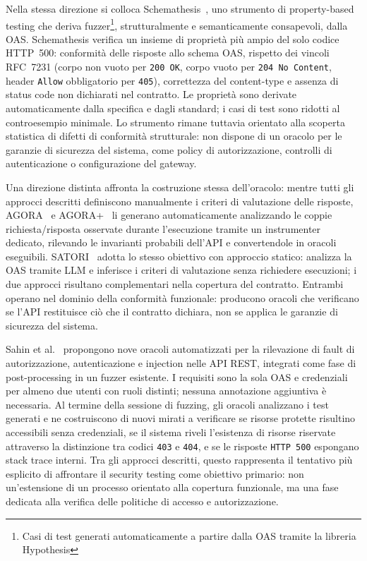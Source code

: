 Nella stessa direzione si colloca Schemathesis~\cite{schemathesisDerivingSemanticsawareFuzzers2022}, uno strumento di property-based testing che deriva fuzzer\footnote{Casi di test generati automaticamente a partire dalla \gls{OAS} tramite la libreria Hypothesis}, strutturalmente e semanticamente consapevoli, dalla \gls{OAS}. Schemathesis verifica un insieme di proprietà più ampio del solo codice HTTP~500: conformità delle risposte allo schema \gls{OAS}, rispetto dei vincoli \gls{RFC}~7231 (corpo non vuoto per \texttt{200~OK}, corpo vuoto per \texttt{204~No~Content}, header \texttt{Allow} obbligatorio per \texttt{405}), correttezza del content-type e assenza di status code non dichiarati nel contratto. Le proprietà sono derivate automaticamente dalla specifica e dagli standard; i casi di test sono ridotti al controesempio minimale. Lo strumento rimane tuttavia orientato alla scoperta statistica di difetti di conformità strutturale: non dispone di un oracolo per le garanzie di sicurezza del sistema, come policy di autorizzazione, controlli di autenticazione o configurazione del gateway.

Una direzione distinta affronta la costruzione stessa dell'oracolo: mentre tutti gli approcci descritti definiscono manualmente i criteri di valutazione delle risposte, AGORA~\cite{alonsoAGORAAutomatedGeneration2023} e AGORA+~\cite{alonsoAgora+TestOracleGeneration2025} li generano automaticamente analizzando le coppie richiesta/risposta osservate durante l'esecuzione tramite un instrumenter dedicato, rilevando le invarianti probabili dell'API e convertendole in oracoli eseguibili. SATORI~\cite{alonsoSATORIStaticTest2025} adotta lo stesso obiettivo con approccio statico: analizza la \gls{OAS} tramite \gls{LLM} e inferisce i criteri di valutazione senza richiedere esecuzioni; i due approcci risultano complementari nella copertura del contratto. Entrambi operano nel dominio della conformità funzionale: producono oracoli che verificano se l'\gls{API} restituisce ciò che il contratto dichiara, non se applica le garanzie di sicurezza del sistema.

Sahin et al.~\cite{sahinEnhancingRESTAPI2026} propongono nove oracoli automatizzati per la rilevazione di fault di autorizzazione, autenticazione e injection nelle \gls{API} REST, integrati come fase di post-processing in un fuzzer esistente. I requisiti sono la sola \gls{OAS} e credenziali per almeno due utenti con ruoli distinti; nessuna annotazione aggiuntiva è necessaria. Al termine della sessione di fuzzing, gli oracoli analizzano i test generati e ne costruiscono di nuovi mirati a verificare se risorse protette risultino accessibili senza credenziali, se il sistema riveli l'esistenza di risorse riservate attraverso la distinzione tra codici \texttt{403} e \texttt{404}, e se le risposte \texttt{HTTP 500} espongano stack trace interni.
Tra gli approcci descritti, questo rappresenta il tentativo più esplicito di affrontare il security testing come obiettivo primario: non un'estensione di un processo orientato alla copertura funzionale, ma una fase dedicata alla verifica delle politiche di accesso e autorizzazione.


